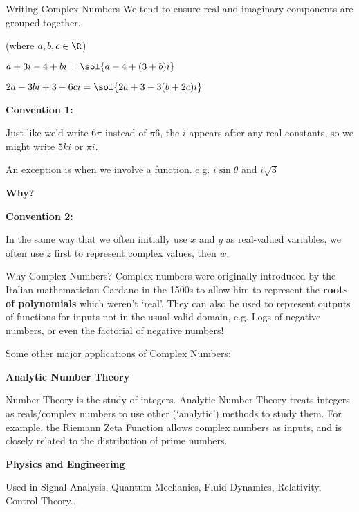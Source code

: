 \documentclass[8pt]{beamer}
\begin{document}
	\begin{frame}{Writing Complex Numbers}
	    We tend to ensure real and imaginary components are grouped together.
	    
	    (where $a,b,c \in \R$)
	    
	    $a+3i-4+bi = \sol{a-4+(3+b)i}$
	    
	    $2a-3bi+3-6ci = \sol{2a+3-3(b+2c)i}$
	    
	    \textbf{Convention 1:}
	    
	    Just like we’d write $6\pi$ instead of $\pi6$, the $i$ appears after any real constants, so we might write $5ki$ or $\pi i$. 

        An exception is when we involve a function.
        e.g. $i\sin{\theta}$  and $i\sqrt{3}$
        
        \textbf{Why?} 
        
        \textbf{Convention 2:}
        
        In the same way that we often initially use $x$ and $y$ as real-valued variables, we often use $z$ first to represent complex values, then $w$.
	\end{frame}
	
	\begin{frame}{Why Complex Numbers?}
	    Complex numbers were originally introduced by the Italian mathematician Cardano in the 1500s to allow him to represent the \textbf{roots of polynomials} which weren’t ‘real’. They can also be used to represent outputs of functions for inputs not in the usual valid domain, e.g. Logs of negative numbers, or even the factorial of negative numbers!
	    
        Some other major applications of Complex Numbers:
        
	    \textbf{Analytic Number Theory}
	    
	    Number Theory is the study of integers. Analytic Number Theory treats integers as reals/complex numbers to use other (‘analytic’) methods to study them. For example, the Riemann Zeta Function allows complex numbers as inputs, and is closely related to the distribution of prime numbers. 
	    
        \textbf{Physics and Engineering}
        
        Used in Signal Analysis, Quantum Mechanics, Fluid Dynamics, Relativity, Control Theory...
        
	\end{frame}
	
\end{document}

